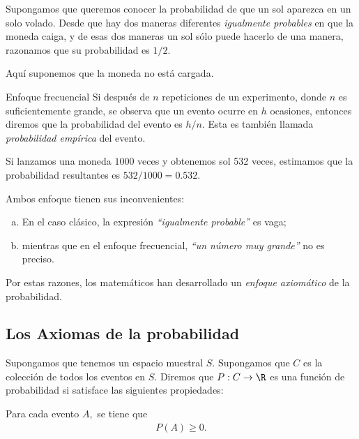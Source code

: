  \begin{exmp}
  \label{exmp:1.10}
  Supongamos que queremos conocer la probabilidad de que un sol aparezca en un solo volado.  Desde que hay dos maneras diferentes \emph{igualmente probables} en que la moneda caiga,  y de esas dos maneras un sol sólo puede hacerlo de una manera, razonamos que su probabilidad es $1/2.$
    

  \begin{rem}
   Aquí suponemos que la moneda no está cargada.
  \end{rem}

 \end{exmp}


{Enfoque frecuencial}
Si después de $n$ repeticiones de un experimento, donde $n$ es suficientemente grande, se observa que un evento ocurre en $h$ ocasiones, entonces diremos que la probabilidad del evento es $h/n.$  Esta es también llamada \emph{probabilidad empírica} del evento.

{}
\begin{exmp}
 \label{exmp:1.11}
 Si lanzamos una moneda $1000$ veces y obtenemos sol 532 veces, estimamos que la probabilidad resultantes es $532/1000=0.532$.
\end{exmp}



 \begin{rem}
  Ambos enfoque tienen sus inconvenientes:
  \begin{enumerate}[(a)]
   \item En el caso clásico, la expresión \emph{``igualmente probable''} es vaga; 
   \item mientras que en el enfoque frecuencial, \emph{``un número muy grande''} no es preciso. 
  \end{enumerate}
Por estas razones, los matemáticos han desarrollado un \emph{enfoque axiomático} de la probabilidad.
 \end{rem}


\subsection{Los Axiomas de la probabilidad}
{}
Supongamos que tenemos un espacio muestral $S.$ Supongamos que $C$ es la colección de todos los eventos en $S.$ Diremos que $P:C \to \R$ es una función de probabilidad si satisface las siguientes propiedades:



\begin{axiom}
   Para cada evento $A,$ se tiene que
   \begin{align}
   \label{1.1}
    P(A)\geq 0.
   \end{align}

\end{axiom}



